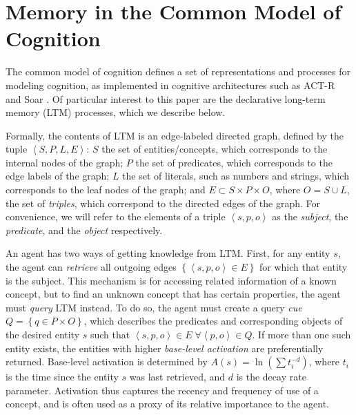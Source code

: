 \documentclass[10pt,letterpaper]{article}
\newcommand{\setof}[1]{\left \{ #1 \right \}}
\newcommand{\tuple}[1]{\left \langle #1 \right \rangle }
\begin{document}

\section{Memory in the Common Model of Cognition}

The common model of cognition \cite{Laird2017AStandardModel} defines a set of representations and processes for modeling cognition, as implemented in cognitive architectures such as ACT-R and Soar \cite{Anderson2007HowCanThe,Laird2012TheSoarCognitive}.
Of particular interest to this paper are the declarative long-term memory (LTM) processes, which we describe below.

Formally, the contents of LTM is an edge-labeled directed graph, defined by the tuple $\tuple{S, P, L, E}$:
$S$ the set of entities/concepts, which corresponds to the internal nodes of the graph;
$P$ the set of predicates, which corresponds to the edge labels of the graph;
$L$ the set of literals, such as numbers and strings, which corresponds to the leaf nodes of the graph;
and $E\subset S{\times}P{\times}O$, where $O=S \cup L$, the set of \emph{triples}, which correspond to the directed edges of the graph.
For convenience, we will refer to the elements of a triple $\tuple{s, p, o}$ as the \emph{subject}, the \emph{predicate}, and the \emph{object} respectively.

An agent has two ways of getting knowledge from LTM.
First, for any entity $s$, the agent can \emph{retrieve} all outgoing edges $\setof{\tuple{s, p, o}{\in}E}$ for which that entity is the subject.
This mechanism is for accessing related information of a known concept, but to find an unknown concept that has certain properties, the agent must \emph{query} LTM instead.
To do so, the agent must create a query \emph{cue} $Q = \setof{q \in P{\times}O}$, which describes the predicates and corresponding objects of the desired entity $s$ such that $\tuple{s, p, o} \in E \; \forall \tuple{p, o} \in Q$.
If more than one such entity exists, the entities with higher \emph{base-level activation} are preferentially returned.
Base-level activation is determined by $A(s) = \ln (\sum {t_i^{-d}})$, where $t_i$ is the time since the entity $s$ was last retrieved, and $d$ is the decay rate parameter.
Activation thus captures the recency and frequency of use of a concept, and is often used as a proxy of its relative importance to the agent.
\end{document}
